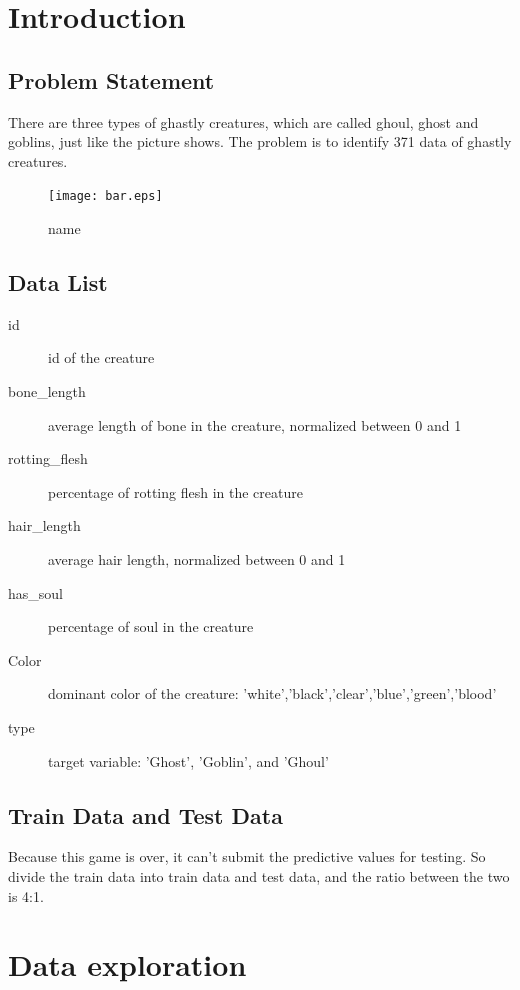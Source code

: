 
\section{Introduction}\label{sec-intro}

\subsection{Problem Statement}
There are three types of ghastly creatures, which are called ghoul, ghost and goblins, just like the picture shows. The problem is to identify 371 data of ghastly creatures. 


\begin{figure}[htbp]\centering
	\texttt{[image: bar.eps]}
	\caption{name}
\end{figure}


\subsection{Data List}

\begin{description}
	\item[id] id of the creature
	\item[bone_length] average length of bone in the creature, normalized between 0 and 1
	\item[rotting_flesh] percentage of rotting flesh in the creature
	\item[hair_length] average hair length, normalized between 0 and 1
	\item[has_soul] percentage of soul in the creature
	\item[Color] dominant color of the creature: 'white','black','clear','blue','green','blood'
	\item[type] target variable: 'Ghost', 'Goblin', and 'Ghoul'
\end{description}

\subsection{Train Data and Test Data}
Because this game is over, it can't submit the predictive values for testing. So divide the train data into train data and test data, and the ratio between the two is 4:1.

\section{Data exploration} \label{sec-data_exploration}

